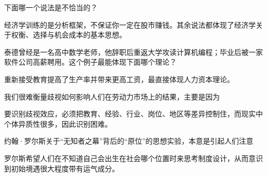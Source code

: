 \begin{question}
下面哪一个说法是不恰当的？
\begin{choiceoptions}[1]
\end{choiceoptions}
\begin{solution}
经济学训练的是分析框架，不保证你一定在股市赚钱。其余说法都体现了经济学关于权衡、选择与机会成本的基本思想。
\end{solution}
\end{question}

\begin{question}
泰德曾经是一名高中数学老师，他辞职后重返大学攻读计算机编程；毕业后被一家软件公司高薪聘用。这个例子最能体现下面哪个理论？
\begin{choiceoptions}[2]
\end{choiceoptions}
\begin{solution}
重新接受教育提高了生产率并带来更高工资，最直接体现人力资本理论。
\end{solution}
\end{question}

\begin{question}
我们很难衡量歧视如何影响人们在劳动力市场上的结果，主要是因为
\begin{choiceoptions}[2]
\end{choiceoptions}
\begin{solution}
要识别歧视效应，必须把教育、经验、行业、岗位、地区等差异控制住，而现实中个体异质性很多，因此识别困难。
\end{solution}
\end{question}

\begin{question}
约翰·罗尔斯关于“无知者之幕”背后的“原位”的思想实验，本意是引起人们注意
\begin{choiceoptions}[2]
\end{choiceoptions}
\begin{solution}
罗尔斯希望人们在不知道自己会出生在社会哪个位置时来思考制度设计，从而意识到初始境遇很大程度带有运气成分。
\end{solution}
\end{question}

